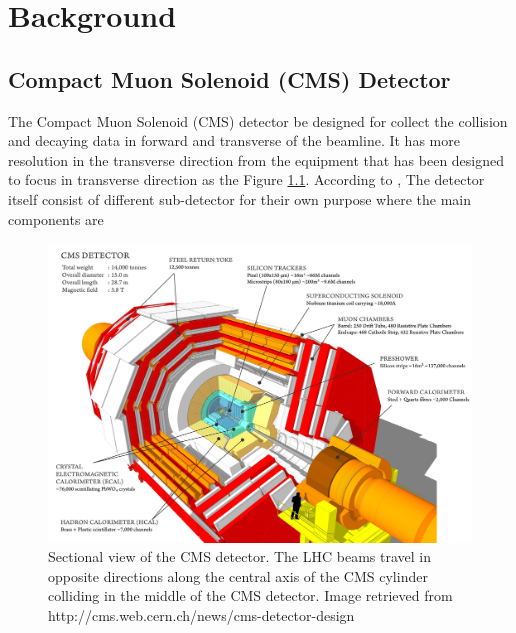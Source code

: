 \chapter{Background}


\section{Compact Muon Solenoid (CMS) Detector}

The Compact Muon Solenoid (CMS) detector be designed for collect the collision and decaying data in forward and transverse of the beamline.
It has more resolution in the transverse direction from the equipment that has been designed to focus in transverse direction as the Figure \ref{fig:cms_structure}.
According to \cite{cms_design_report}, The detector itself consist of different sub-detector for their own purpose where the main components are
\begin{figure}[h!]
    \includegraphics[width=\textwidth]{images/cms_structure.png}
    \caption{Sectional view of the CMS detector. The LHC beams travel in opposite directions along the central axis of the CMS cylinder colliding in the middle of the CMS detector. Image retrieved from http://cms.web.cern.ch/news/cms-detector-design}
    \label{fig:cms_structure}
\end{figure}
